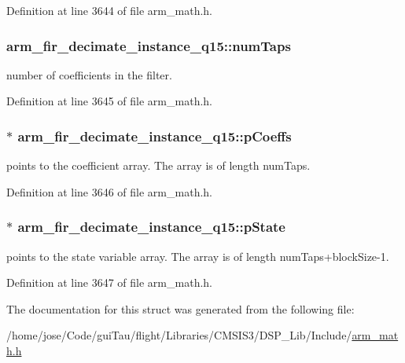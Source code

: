 Definition at line 3644 of file arm\-\_\-math.\-h.

\hypertarget{structarm__fir__decimate__instance__q15_ac1e9844488ec717da334fbd4c4f41990}{
\subsubsection[{num\-Taps}]{ arm\-\_\-fir\-\_\-decimate\-\_\-instance\-\_\-q15\-::num\-Taps}}\label{structarm__fir__decimate__instance__q15_ac1e9844488ec717da334fbd4c4f41990}
number of coefficients in the filter. 

Definition at line 3645 of file arm\-\_\-math.\-h.

\hypertarget{structarm__fir__decimate__instance__q15_a01cacab67e73945e8289075598ede14d}{
\subsubsection[{p\-Coeffs}]{$\ast$ arm\-\_\-fir\-\_\-decimate\-\_\-instance\-\_\-q15\-::p\-Coeffs}}\label{structarm__fir__decimate__instance__q15_a01cacab67e73945e8289075598ede14d}
points to the coefficient array. The array is of length num\-Taps. 

Definition at line 3646 of file arm\-\_\-math.\-h.

\hypertarget{structarm__fir__decimate__instance__q15_a3f7b5184bb28853ef401b001df121047}{
\subsubsection[{p\-State}]{$\ast$ arm\-\_\-fir\-\_\-decimate\-\_\-instance\-\_\-q15\-::p\-State}}\label{structarm__fir__decimate__instance__q15_a3f7b5184bb28853ef401b001df121047}
points to the state variable array. The array is of length num\-Taps+block\-Size-\/1. 

Definition at line 3647 of file arm\-\_\-math.\-h.



The documentation for this struct was generated from the following file\-:\begin{DoxyCompactItemize}
\item 
/home/jose/\-Code/gui\-Tau/flight/\-Libraries/\-C\-M\-S\-I\-S3/\-D\-S\-P\-\_\-\-Lib/\-Include/\hyperlink{arm__math_8h}{arm\-\_\-math.\-h}\end{DoxyCompactItemize}
